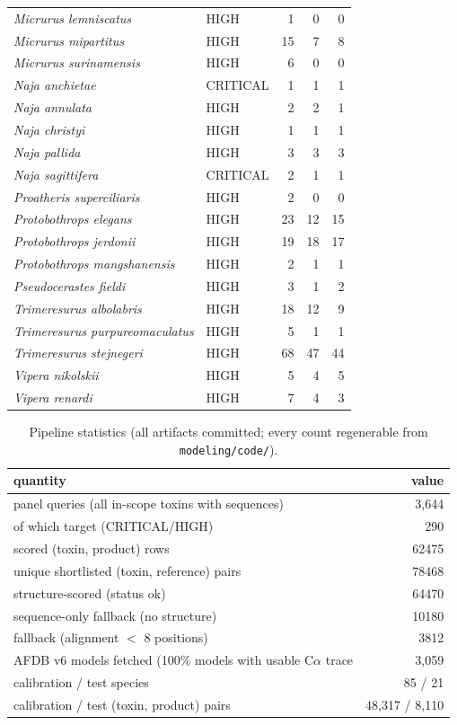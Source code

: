 \documentclass[11pt]{article}
\begin{document}
\begin{longtable}{l l r r r}
\textit{Micrurus lemniscatus} & HIGH & 1 & 0 & 0 \\
\textit{Micrurus mipartitus} & HIGH & 15 & 7 & 8 \\
\textit{Micrurus surinamensis} & HIGH & 6 & 0 & 0 \\
\textit{Naja anchietae} & CRITICAL & 1 & 1 & 1 \\
\textit{Naja annulata} & HIGH & 2 & 2 & 1 \\
\textit{Naja christyi} & HIGH & 1 & 1 & 1 \\
\textit{Naja pallida} & HIGH & 3 & 3 & 3 \\
\textit{Naja sagittifera} & CRITICAL & 2 & 1 & 1 \\
\textit{Proatheris superciliaris} & HIGH & 2 & 0 & 0 \\
\textit{Protobothrops elegans} & HIGH & 23 & 12 & 15 \\
\textit{Protobothrops jerdonii} & HIGH & 19 & 18 & 17 \\
\textit{Protobothrops mangshanensis} & HIGH & 2 & 1 & 1 \\
\textit{Pseudocerastes fieldi} & HIGH & 3 & 1 & 2 \\
\textit{Trimeresurus albolabris} & HIGH & 18 & 12 & 9 \\
\textit{Trimeresurus purpureomaculatus} & HIGH & 5 & 1 & 1 \\
\textit{Trimeresurus stejnegeri} & HIGH & 68 & 47 & 44 \\
\textit{Vipera nikolskii} & HIGH & 5 & 4 & 5 \\
\textit{Vipera renardi} & HIGH & 7 & 4 & 3 \\
\hline\hline\end{longtable}

\begin{table}[h]\centering\small
\caption{Pipeline statistics (all artifacts committed; every count regenerable from \texttt{modeling/code/}).}
\begin{tabular}{l r}\hline\hline
quantity & value \\ \hline\hline
panel queries (all in-scope toxins with sequences) & 3,644 \\
\quad of which target (CRITICAL/HIGH) & 290 \\
scored (toxin, product) rows & 62475 \\
unique shortlisted (toxin, reference) pairs & 78468 \\
\quad structure-scored (status ok) & 64470 \\
\quad sequence-only fallback (no structure) & 10180 \\
\quad fallback (alignment $<$ 8 positions) & 3812 \\
AFDB v6 models fetched (100\%%
\quad models with usable C$\alpha$ trace & 3,059 \\
calibration / test species & 85 / 21 \\
calibration / test (toxin, product) pairs & 48,317 / 8,110 \\
\hline\hline\end{tabular}\end{table}
\end{document}
